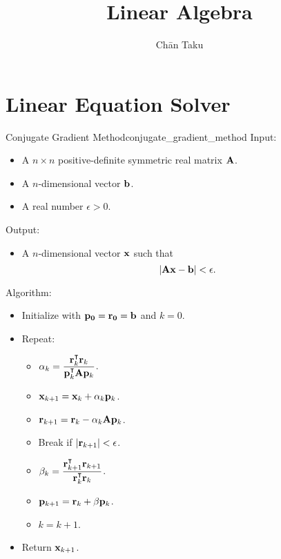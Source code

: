 \documentclass{article}
\title{Linear Algebra}
\author{Ch\=an Taku}
\begin{document}
\maketitle

\section{Linear Equation Solver}

\begin{theorem}{Conjugate Gradient Method}{conjugate_gradient_method}
Input:
\begin{itemize}
    \item A $n\times n$ positive-definite symmetric real matrix $\vb{A}$.
    \item A $n$-dimensional vector $\vb{b}$.
    \item A real number $\epsilon > 0$.
\end{itemize}
Output:
\begin{itemize}
    \item A $n$-dimensional vector $\vb{x}$ such that
    \[ \abs{\vb{A}\vb{x} - \vb{b}} < \epsilon. \]
\end{itemize}
Algorithm:
\begin{itemize}
    \item Initialize with $\vb{p_0} = \vb{r_0} = \vb{b}$ and $k = 0$.
    \item Repeat:
    \begin{itemize}
        \item $\displaystyle \alpha_k = \frac{\vb{r}_k^\intercal \vb{r}_k}{\vb{p}_k^\intercal \vb{A} \vb{p}_k}$.
        \item $\displaystyle \vb{x}_{k+1} = \vb{x}_k + \alpha_k \vb{p}_k$.
        \item $\displaystyle \vb{r}_{k+1} = \vb{r}_k - \alpha_k \vb{A}\vb{p}_k$.
        \item Break if $\abs{\vb{r}_{k+1}} < \epsilon$.
        \item $\displaystyle \beta_k = \frac{\vb{r}^\intercal_{k+1}\vb{r}_{k+1}}{\vb{r}^\intercal_{k}\vb{r}_{k}}$.
        \item $\displaystyle \vb{p}_{k+1} = \vb{r}_k + \beta \vb{p}_k$.
        \item $k=k+1$.
    \end{itemize}
    \item Return $\vb{x}_{k+1}$.
\end{itemize}
\end{theorem}

% 
% 
\end{document}

